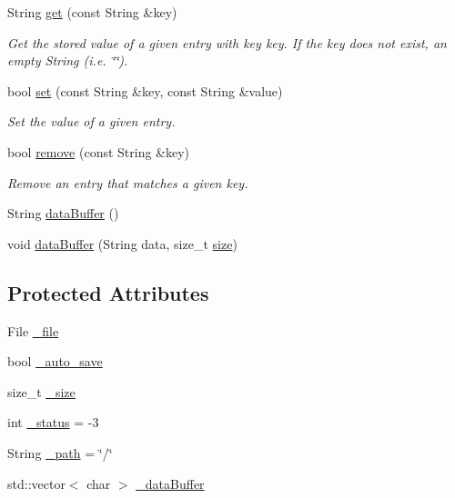 \begin{DoxyCompactItemize}
String \mbox{\hyperlink{class_nv_mem_json_file_dict_ab6f75e7c39abfb09f31217d2a4a1ae14}{get}} (const String \&key)
\begin{DoxyCompactList}\small\item\em Get the stored value of a given entry with key {\ttfamily key}. If the {\ttfamily key} does not exist, an empty {\ttfamily String} (i.\+e. {\ttfamily \char`\"{}\char`\"{}}). \end{DoxyCompactList}\item 
bool \mbox{\hyperlink{class_nv_mem_json_file_dict_aec669b13cce54561e2f26074dea4d10d}{set}} (const String \&key, const String \&value)
\begin{DoxyCompactList}\small\item\em Set the value of a given entry. \end{DoxyCompactList}\item 
bool \mbox{\hyperlink{class_nv_mem_json_file_dict_a6e0bd4044fc8a65c10a1ed1da5dd8a55}{remove}} (const String \&key)
\begin{DoxyCompactList}\small\item\em Remove an entry that matches a given {\ttfamily key}. \end{DoxyCompactList}\item 
String \mbox{\hyperlink{class_nv_mem_json_file_dict_a6de6f10fa78add9b0918115ea4a220f6}{data\+Buffer}} ()
\item 
void \mbox{\hyperlink{class_nv_mem_json_file_dict_a6889bd39213424ad5a8c193b957c0a30}{data\+Buffer}} (String data, size\+\_\+t \mbox{\hyperlink{class_nv_mem_json_file_dict_ae00ca1a78ae7e0d71fc8f36bc97bb32d}{size}})
\end{DoxyCompactItemize}
\subsection*{Protected Attributes}
\begin{DoxyCompactItemize}
\item 
File \mbox{\hyperlink{class_nv_mem_json_file_dict_a26ced476468a309e4677a102602d2c51}{\+\_\+file}}
\item 
bool \mbox{\hyperlink{class_nv_mem_json_file_dict_afb9a35494c87bf2c2f7eecf3de0b8fb9}{\+\_\+auto\+\_\+save}}
\item 
size\+\_\+t \mbox{\hyperlink{class_nv_mem_json_file_dict_a7ea5616a9867b0b32e262ce093bfe8be}{\+\_\+size}}
\item 
int \mbox{\hyperlink{class_nv_mem_json_file_dict_aa6a81cbcf5023df029ad661d98a7cdfb}{\+\_\+status}} = -\/3
\item 
String \mbox{\hyperlink{class_nv_mem_json_file_dict_a9c5da238d33584b2541de96ce7d2b59c}{\+\_\+path}} = \char`\"{}/\char`\"{}
\item 
std\+::vector$<$ char $>$ \mbox{\hyperlink{class_nv_mem_json_file_dict_a5639b383eb795c754fda0c6f007f304f}{\+\_\+data\+Buffer}}
\end{DoxyCompactItemize}
